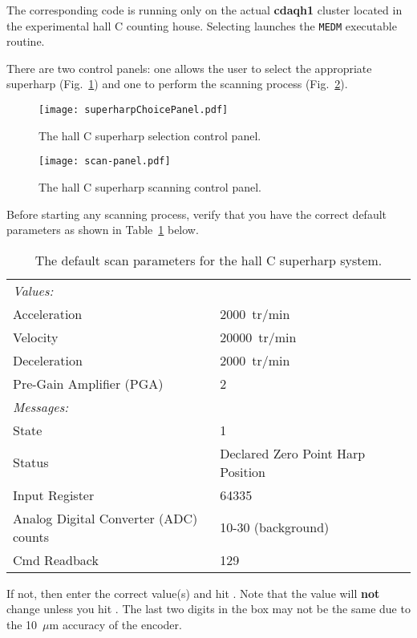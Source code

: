 {The corresponding code is running only on the actual {\bf cdaqh1} cluster located in the experimental
hall C counting house. Selecting {\bf{}} launches the {\tt MEDM} executable routine.

There are two control panels: one allows the user to select the appropriate superharp
(Fig.~\ref{figure:choose_harp}) and one to perform the scanning process (Fig.~\ref{figure:scan_harp}).

\begin{figure}[!hbt]
\begin{center}
\texttt{[image: superharpChoicePanel.pdf]}
\caption{The hall C superharp selection control panel.}\label{figure:choose_harp}
\end{center}
\end{figure}


\begin{figure}[!hbt]
\begin{center}
\texttt{[image: scan-panel.pdf]}
\caption{The hall C superharp scanning control panel.}\label{figure:scan_harp}
\end{center}
\end{figure}

Before starting any scanning process, verify that you have the correct default parameters as shown in
Table~\ref{table:scan_harp} below.
\begin{table}[!hbt]
\begin{center}
\begin{tabular}{llr}
\hline
\hline
{\it Values:}			&	\\ 
Acceleration			& 2000~tr/min	\\
Velocity			& 20000~tr/min	\\
Deceleration			& 2000~tr/min	\\
Pre-Gain Amplifier (PGA)	& 2	\\
\hline
\hline
{\it Messages:} 		&	\\
State				& 1	\\
Status				& Declared Zero Point Harp Position \\
Input Register			& 64335 \\
Analog Digital Converter (ADC) counts& 10-30 (background) \\
Cmd Readback			& 129	\\
\hline
\hline
\end{tabular}
	\caption{The default scan parameters for the hall C superharp system.}
	\label{table:scan_harp}
\end{center}
\end{table}
If not, then enter the correct value(s) and hit {\bf{}}. Note that the value will {\bf not}
change  unless you hit . The last two digits in the
{\bf{}} box may
not be the same due to the 10~$\mu$m accuracy of the encoder.

}

